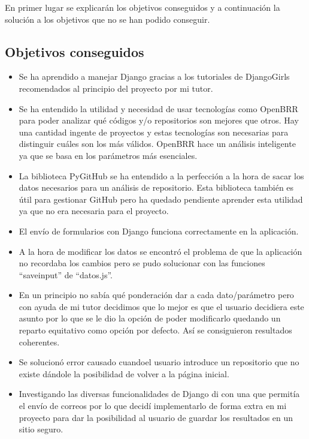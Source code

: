 \documentclass[a4paper, 12pt]{book}
\begin{document}
En primer lugar se explicarán los objetivos conseguidos y a continuación la solución a los objetivos que no se han podido conseguir.

\subsection{Objetivos conseguidos}

\begin{itemize}
	\item Se ha aprendido a manejar Django gracias a los tutoriales de DjangoGirls recomendados al principio del proyecto por mi tutor.
	\item Se ha entendido la utilidad y necesidad de usar tecnologías como OpenBRR para poder analizar qué códigos y/o repositorios son mejores que otros. Hay una cantidad ingente de proyectos y estas tecnologías son necesarias para distinguir cuáles son los más válidos. OpenBRR hace un análisis inteligente ya que se basa en los parámetros más esenciales.
	\item La biblioteca PyGitHub se ha entendido a la perfección a la hora de sacar los datos necesarios para un análisis de repositorio. Esta biblioteca también es útil para gestionar GitHub pero ha quedado pendiente aprender esta utilidad ya que no era necesaria para el proyecto.
	\item El envío de formularios con Django funciona correctamente en la aplicación.
	\item A la hora de modificar los datos se encontró el problema de que la aplicación no recordaba los cambios pero se pudo solucionar con las funciones ``save\textunderscore input'' de ``datos.js''.
	\item En un principio no sabía qué ponderación dar a cada dato/parámetro pero con ayuda de mi tutor decidimos que lo mejor es que el usuario decidiera este asunto por lo que se le dio la opción de poder modificarlo quedando un reparto equitativo como opción por defecto. Así se consiguieron resultados coherentes.
	\item Se solucionó error causado cuandoel usuario introduce un repositorio que no existe dándole la posibilidad de volver a la página inicial.
	\item Investigando las diversas funcionalidades de Django di con una que permitía el envío de correos por lo que decidí implementarlo de forma extra en mi proyecto para dar la posibilidad al usuario de guardar los resultados en un sitio seguro.
\end{itemize}
\end{document}
